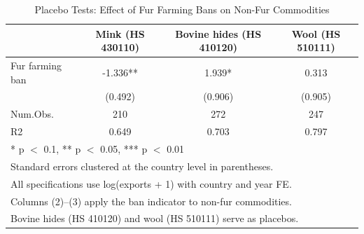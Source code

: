 \begin{table}
\centering
\caption{Placebo Tests: Effect of Fur Farming Bans on Non-Fur Commodities}
\label{tab:placebo}
\centering
\begin{tabular}[t]{lccc}
\toprule
  & Mink (HS 430110) & Bovine hides (HS 410120) & Wool (HS 510111)\\
\midrule
Fur farming ban & -1.336** & 1.939* & 0.313\\
 & (0.492) & (0.906) & (0.905)\\
\midrule
Num.Obs. & 210 & 272 & 247\\
R2 & 0.649 & 0.703 & 0.797\\
\bottomrule
\multicolumn{4}{l}{\rule{0pt}{1em}* p $<$ 0.1, ** p $<$ 0.05, *** p $<$ 0.01}\\
\multicolumn{4}{l}{\rule{0pt}{1em}Standard errors clustered at the country level in parentheses.}\\
\multicolumn{4}{l}{\rule{0pt}{1em}All specifications use log(exports + 1) with country and year FE.}\\
\multicolumn{4}{l}{\rule{0pt}{1em}Columns (2)--(3) apply the ban indicator to non-fur commodities.}\\
\multicolumn{4}{l}{\rule{0pt}{1em}Bovine hides (HS 410120) and wool (HS 510111) serve as placebos.}\\
\end{tabular}
\end{table}

